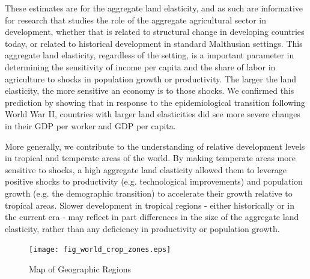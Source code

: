 \documentclass[12pt]{article}
\begin{document}
These estimates are for the aggregate land elasticity, and as such are informative for research that studies the role of the aggregate agricultural sector in development, whether that is related to structural change in developing countries today, or related to historical development in standard Malthusian settings. This aggregate land elasticity, regardless of the setting, is a important parameter in determining the sensitivity of income per capita and the share of labor in agriculture to shocks in population growth or productivity. The larger the land elasticity, the more sensitive an economy is to those shocks. We confirmed this prediction by showing that in response to the epidemiological transition following World War II, countries with larger land elasticities did see more severe changes in their GDP per worker and GDP per capita.

More generally, we contribute to the understanding of relative development levels in tropical and temperate areas of the world. By making temperate areas more sensitive to shocks, a high aggregate land elasticity allowed them to leverage positive shocks to productivity (e.g. technological improvements) and population growth (e.g. the demographic transition) to accelerate their growth relative to tropical areas. Slower development in tropical regions - either historically or in the current era - may reflect in part differences in the size of the aggregate land elasticity, rather than any deficiency in productivity or population growth. 

\newpage

\clearpage

\onehalfspacing
{\small


}

\clearpage

\begin{figure}[!htb]
\begin{center}
\caption{Map of Geographic Regions}
\label{FIG_crop_zones}
\texttt{[image: fig\_world\_crop\_zones.eps]}
\end{center}
\vspace{-.5cm}
\end{figure}
\end{document}
